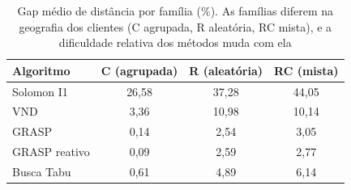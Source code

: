 \begin{table}[H]
\centering\singlespacing
\begin{minipage}{0.72\textwidth}
\caption{Gap médio de distância por família (\%). As famílias diferem na geografia dos clientes (C agrupada, R aleatória, RC mista), e a dificuldade relativa dos métodos muda com ela}
\label{tab:familia}
\centering
\begin{tabular}{lccc}
\toprule
\textbf{Algoritmo} & \textbf{C (agrupada)} & \textbf{R (aleatória)} & \textbf{RC (mista)} \\
\midrule
Solomon I1 & 26{,}58 & 37{,}28 & 44{,}05 \\
VND & 3{,}36 & 10{,}98 & 10{,}14 \\
GRASP & 0{,}14 & 2{,}54 & 3{,}05 \\
GRASP reativo & 0{,}09 & 2{,}59 & 2{,}77 \\
Busca Tabu & 0{,}61 & 4{,}89 & 6{,}14 \\
\bottomrule
\end{tabular}
\end{minipage}
\end{table}
